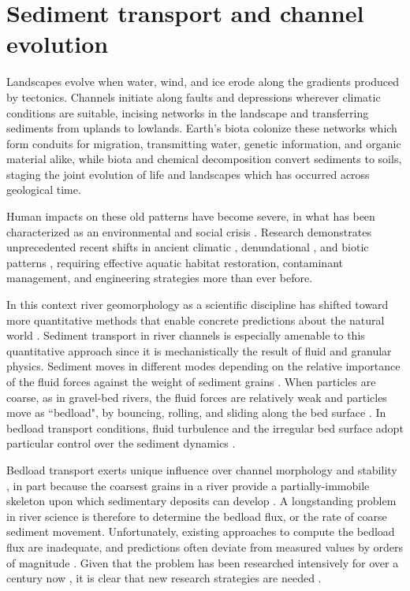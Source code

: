 
\chapter{Sediment transport and channel evolution}
\label{ch:Introduction}

Landscapes evolve when water, wind, and ice erode along the gradients produced by tectonics.
Channels initiate along faults and depressions wherever climatic conditions are suitable, incising networks in the landscape and transferring sediments from uplands to lowlands.
Earth's biota colonize these networks which form conduits for migration, transmitting water, genetic information, and organic material alike, while biota and chemical decomposition convert sediments to soils, staging the joint evolution of life and landscapes which has occurred across geological time.

Human impacts on these old patterns have become severe, in what has been characterized as an environmental and social crisis \citep{Slaymaker2021}.
Research demonstrates unprecedented recent shifts in ancient climatic \citep{Sivan2004,Slater2021}, denundational \citep{Hooke2000,Szabo2010}, and biotic patterns \citep{Walther2002,Willis2009}, requiring effective aquatic habitat restoration, contaminant management, and engineering strategies more than ever before.

In this context river geomorphology as a scientific discipline has shifted toward more quantitative methods that enable concrete predictions about the natural world \citep{Church2005,Church2010}.
Sediment transport in river channels is especially amenable to this quantitative approach since it is mechanistically the result of fluid and granular physics.
Sediment moves in different modes depending on the relative importance of the fluid forces against the weight of sediment grains \citep{Bagnold1956}.
When particles are coarse, as in gravel-bed rivers, the fluid forces are relatively weak and particles move as ``bedload", by bouncing, rolling, and sliding along the bed surface \citep{Kalinske1947}.
In bedload transport conditions, fluid turbulence and the irregular bed surface adopt particular control over the sediment dynamics \citep{Ferreira2015}.

Bedload transport exerts unique influence over channel morphology and stability \citep{Church2006,Recking2016}, in part because the coarsest grains in a river provide a partially-immobile skeleton upon which sedimentary deposits can develop \citep{Hassan2008, Eaton2020}.
A longstanding problem in river science is therefore to determine the bedload flux, or the rate of coarse sediment movement.
Unfortunately, existing approaches to compute the bedload flux are inadequate, and predictions often deviate from measured values by orders of magnitude \citep{Gomez1989, Barry2004, Bathurst2007a, Recking2012}.
Given that the problem has been researched intensively for over a century now \citep{Gilbert1914}, it is clear that new research strategies are needed \citep{Ancey2020a,Ancey2020}.


